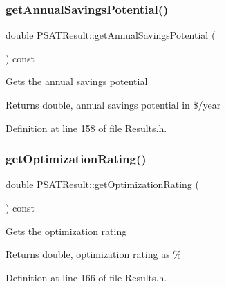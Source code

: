 \subsubsection{\texorpdfstring{get\+Annual\+Savings\+Potential()}{getAnnualSavingsPotential()}\hspace{0.1cm}{\footnotesize\ttfamily [3/3]}}
{\footnotesize\ttfamily double P\+S\+A\+T\+Result\+::get\+Annual\+Savings\+Potential (\begin{DoxyParamCaption}{ }\end{DoxyParamCaption}) const\hspace{0.3cm}{\ttfamily [inline]}}

Gets the annual savings potential \begin{DoxyReturn}{Returns}
double, annual savings potential in \$/year 
\end{DoxyReturn}


Definition at line 158 of file Results.\+h.

\mbox{\label{class_p_s_a_t_result_aa0a7001461408fcb06a6c22ce2d064db}} 
\subsubsection{\texorpdfstring{get\+Optimization\+Rating()}{getOptimizationRating()}\hspace{0.1cm}{\footnotesize\ttfamily [1/3]}}
{\footnotesize\ttfamily double P\+S\+A\+T\+Result\+::get\+Optimization\+Rating (\begin{DoxyParamCaption}{ }\end{DoxyParamCaption}) const\hspace{0.3cm}{\ttfamily [inline]}}

Gets the optimization rating \begin{DoxyReturn}{Returns}
double, optimization rating as \% 
\end{DoxyReturn}


Definition at line 166 of file Results.\+h.

\mbox{\label{class_p_s_a_t_result_aa0a7001461408fcb06a6c22ce2d064db}} 
